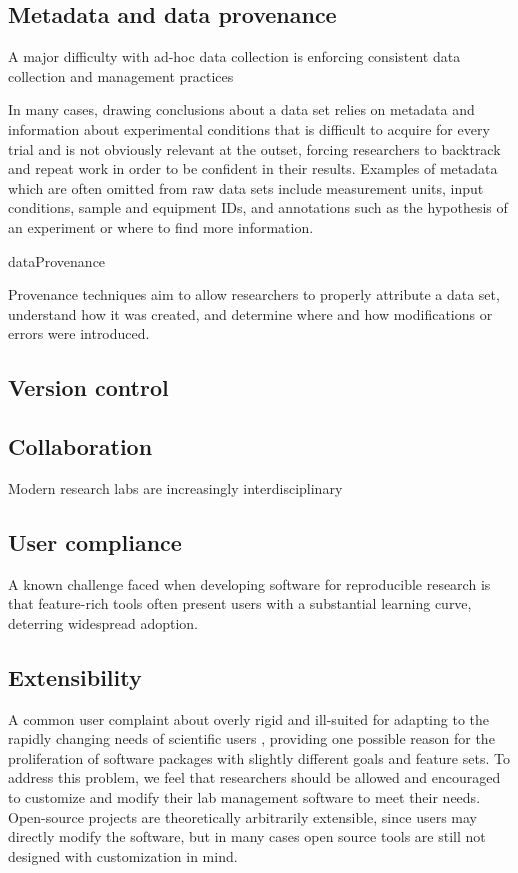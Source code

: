 \documentclass[../thesis]{subfiles}
\begin{document}
\subsection{Metadata and data provenance}
A major difficulty with ad-hoc data collection is enforcing consistent
data collection and management practices

In many cases, drawing conclusions about a data set relies on
metadata and information about experimental conditions that is
difficult to acquire for every trial and is not obviously
relevant at the outset, forcing researchers to backtrack and repeat
work in order to be confident in their results. Examples of
metadata which are often omitted from raw data sets include
measurement units, input conditions, sample and equipment IDs, and
annotations such as the hypothesis of an experiment or where to find
more information.

\gls{dataProvenance}

Provenance techniques aim to allow researchers to properly attribute a
data set, understand how it was created, and determine where and how
modifications or errors were introduced.

\subsection{Version control}


\subsection{Collaboration}
Modern research labs are increasingly interdisciplinary

\subsection{User compliance}
A known challenge faced when developing software for reproducible research
is that feature-rich tools often present users with a substantial
learning curve, deterring widespread adoption.

\subsection{Extensibility}
A common user complaint about  overly rigid and ill-suited for
adapting to the rapidly changing needs of scientific users \cite{},
providing one possible reason for the proliferation of software
packages with slightly different goals and feature sets. To address
this problem, we feel that researchers should be allowed and
encouraged to customize and modify their lab management software to
meet their needs. Open-source projects are theoretically arbitrarily
extensible, since users may directly modify the software, but in many
cases open source tools are still not designed with customization in
mind.
\end{document}
